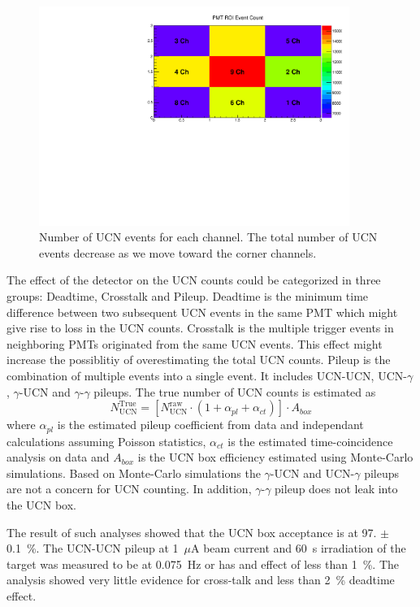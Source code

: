 \begin{figure}[h!]
  \centering
  \includegraphics[width=0.9\textwidth]{channelcounts.pdf}
  \caption{Number of UCN events for each channel. The total number of
    UCN events decrease as we move toward the corner channels.  }
  \label{fig:channelcounts}
\end{figure}


The effect of the detector on the UCN counts could be categorized in
three groups: Deadtime, Crosstalk and Pileup. Deadtime is the minimum
time difference between two subsequent UCN events in the same PMT
which might give rise to loss in the UCN counts. Crosstalk is the
multiple trigger events in neighboring PMTs originated from the same
UCN events. This effect might increase the possiblitiy of
overestimating the total UCN counts. Pileup is the combination of
multiple events into a single event. It includes UCN-UCN,
UCN-$\gamma$, $\gamma$-UCN and $\gamma$-$\gamma$ pileups. The true
number of UCN counts is estimated as
\begin{equation}
  \label{eqn:trueUCN}
  N^{\mathrm{True}}_{\mathrm{UCN}} = \left [ N^{\mathrm{raw}}_{\mathrm{UCN}} \cdot \left( 1 + \alpha_{pl} + \alpha_{ct}\right) \right] \cdot A_{box}
\end{equation}
where $\alpha_{pl}$ is the estimated pileup coefficient from data and
independant calculations assuming Poisson statistics, $\alpha_{ct}$ is
the estimated time-coincidence analysis on data and $A_{box}$ is the
UCN box efficiency estimated using Monte-Carlo simulations. Based on
Monte-Carlo simulations the $\gamma$-UCN and UCN-$\gamma$ pileups are
not a concern for UCN counting. In addition, $\gamma$-$\gamma$ pileup
does not leak into the UCN box.

The result of such analyses showed that the UCN box acceptance is at
97. $\pm$ 0.1~\%. The UCN-UCN pileup at 1~$\mu$A beam current and 60~s
irradiation of the target was measured to be at 0.075~Hz or has and
effect of less than 1~\%. The analysis showed very little evidence for
cross-talk and less than 2~\% deadtime effect.



